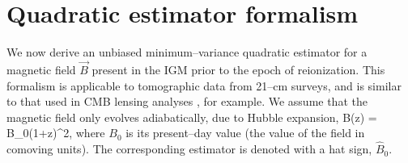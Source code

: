 \section{Quadratic estimator formalism}
\label{sec:estimators}

We now derive an unbiased minimum--variance quadratic estimator for a magnetic field $\vec B$ present in the IGM prior to the epoch of reionization. This formalism is applicable to tomographic data from 21--cm surveys, and is similar to that used in CMB lensing analyses \cite{2003PhRvD..67h3002O}, for example. We assume that the magnetic field only evolves adiabatically, due to Hubble expansion, 
\beq
B(z) = B_0(1+z)^2,
\label{eq:B0}
\eeq
where $B_0$ is its present--day value (the value of the field in comoving units). The corresponding estimator is denoted with a hat sign, $\widehat B_0$. 

